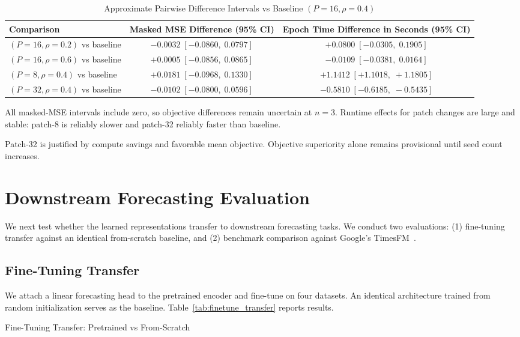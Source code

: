 \documentclass[journal]{IEEEtran}
\begin{document}
\begin{table}[t]
\caption{Approximate Pairwise Difference Intervals vs Baseline $(P=16,\rho=0.4)$}
\label{tab:pairwise_ci}
\centering
\scriptsize
\begin{tabular}{lcc}
\toprule
Comparison & Masked MSE Difference (95\% CI) & Epoch Time Difference in Seconds (95\% CI) \\
\midrule
$(P=16,\rho=0.2)$ vs baseline & $-0.0032\;[-0.0860,\;0.0797]$ & $+0.0800\;[-0.0305,\;0.1905]$ \\
$(P=16,\rho=0.6)$ vs baseline & $+0.0005\;[-0.0856,\;0.0865]$ & $-0.0109\;[-0.0381,\;0.0164]$ \\
$(P=8,\rho=0.4)$ vs baseline  & $+0.0181\;[-0.0968,\;0.1330]$ & $+1.1412\;[+1.1018,\;+1.1805]$ \\
$(P=32,\rho=0.4)$ vs baseline & $-0.0102\;[-0.0800,\;0.0596]$ & $-0.5810\;[-0.6185,\;-0.5435]$ \\
\bottomrule
\end{tabular}
\end{table}

All masked-MSE intervals include zero, so objective differences remain uncertain at $n=3$. Runtime effects for patch changes are large and stable: patch-8 is reliably slower and patch-32 reliably faster than baseline.

Patch-32 is justified by compute savings and favorable mean objective. Objective superiority alone remains provisional until seed count increases.

\section{Downstream Forecasting Evaluation}
We next test whether the learned representations transfer to downstream forecasting tasks. We conduct two evaluations: (1) fine-tuning transfer against an identical from-scratch baseline, and (2) benchmark comparison against Google's TimesFM~\cite{timesfm}.

\subsection{Fine-Tuning Transfer}
We attach a linear forecasting head to the pretrained encoder and fine-tune on four datasets. An identical architecture trained from random initialization serves as the baseline. Table~\ref{tab:finetune_transfer} reports results.

\begin{table}[t]
\caption{Fine-Tuning Transfer: Pretrained vs From-Scratch}
\label{tab:finetune_transfer}
\centering
\scriptsize

\end{table}
\end{document}
